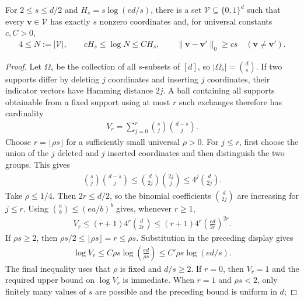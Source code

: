 \documentclass[10pt,a4paper]{amsart}
\begin{document}
\begin{Lemma}\label{lm: sparse constant weight packing}
For $2\leq s\leq d/2$ and $H_s=s\log(ed/s)$, there is a set
$\mathcal V\subseteq\{0,1\}^d$ such that every $\bm v\in\mathcal V$
has exactly $s$ nonzero coordinates and, for universal constants
$c,C>0$,
\begin{align}
    4\leq N:=|\mathcal V|,\qquad
    cH_s\leq\log N\leq CH_s,\qquad
    \|\bm v-\bm v'\|_0\geq cs
    \quad(\bm v\neq\bm v').                               \label{eq: sparse packing lemma conclusion}
\end{align}
\end{Lemma}

\begin{proof}
Let $\Omega_s$ be the collection of all $s$-subsets of $[d]$, so
$|\Omega_s|=\binom ds$.  If two supports differ by deleting $j$
coordinates and inserting $j$ coordinates, their indicator vectors
have Hamming distance $2j$.  A ball containing all supports obtainable
from a fixed support using at most $r$ such exchanges therefore has
cardinality
\begin{align*}
    V_r=\sum_{j=0}^r\binom sj\binom{d-s}{j}.
\end{align*}
Choose $r=\lfloor\rho s\rfloor$ for a sufficiently small universal
$\rho>0$.  For $j\leq r$, first choose the union of the $j$ deleted
and $j$ inserted coordinates and then distinguish the two groups.  This
gives
\begin{align*}
    \binom sj\binom{d-s}{j}
    \leq\binom d{2j}\binom{2j}j
    \leq4^j\binom d{2j}.
\end{align*}
Take $\rho\leq1/4$.  Then $2r\leq d/2$, so the binomial coefficients
$\binom d{2j}$ are increasing for $j\leq r$.  Using
$\binom ab\leq(ea/b)^b$ gives, whenever $r\geq1$,
\begin{align*}
    V_r
    \leq(r+1)4^r\binom d{2r}
    \leq(r+1)4^r\left(\frac{ed}{2r}\right)^{2r}.
\end{align*}
If $\rho s\geq2$, then
$\rho s/2\leq\lfloor\rho s\rfloor=r\leq\rho s$.  Substitution in the
preceding display gives
\begin{align*}
    \log V_r
    \leq C\rho s\log\!\left(\frac{ed}{\rho s}\right)
    \leq C'\rho s\log(ed/s).
\end{align*}
	The final inequality uses that $\rho$ is fixed and $d/s\geq2$.  If
	$r=0$, then $V_r=1$ and the required upper bound on $\log V_r$ is
	immediate. When $r=1$ and $\rho s<2$, only finitely many values of
	$s$ are possible and the preceding bound is uniform in $d$;

\end{proof}
\end{document}
